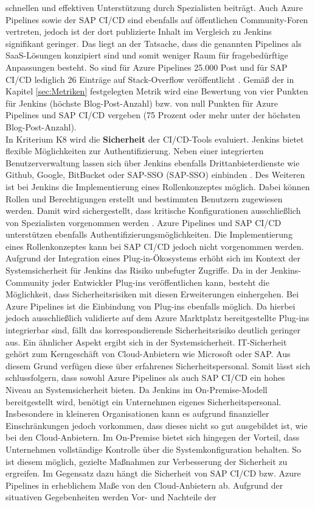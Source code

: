 schnellen und effektiven Unterstützung durch Spezialisten beiträgt. Auch Azure Pipelines sowie der SAP CI/CD sind ebenfalls auf öffentlichen Community-Foren vertreten, jedoch ist der dort publizierte Inhalt im Vergleich zu Jenkins signifikant geringer. Das liegt an der Tatsache, dass die genannten Pipelines als SaaS-Lösungen konzipiert sind und somit weniger Raum für fragebedürftige Anpassungen besteht. So sind für Azure Pipelines 25.000 Post und für SAP CI/CD lediglich 26 Einträge auf Stack-Overflow veröffentlicht \cite{StackOverflow.20230403b}\cite{StackOverflow.20230403c}. Gemäß der in Kapitel \ref{sec:Metriken} festgelegten Metrik wird eine Bewertung von vier Punkten für Jenkins (höchste Blog-Post-Anzahl) bzw. von null Punkten für Azure Pipelines und SAP CI/CD vergeben (75 Prozent oder mehr unter der höchsten Blog-Post-Anzahl).\\ In Kriterium K8 wird die \textbf{Sicherheit} der CI/CD-Tools evaluiert. Jenkins bietet flexible Möglichkeiten zur Authentifizierung. Neben einer integrierten Benutzerverwaltung lassen sich über Jenkins ebenfalls Drittanbieterdienste wie Github, Google, BitBucket oder SAP-\acl{SSO} (SAP-\acs{SSO}) einbinden \cite{.20230410f}\cite{.20230417b}\cite{.20230417c}. Des Weiteren ist bei Jenkins die Implementierung eines Rollenkonzeptes möglich. Dabei können Rollen und Berechtigungen erstellt und bestimmten Benutzern zugewiesen werden. Damit wird sichergestellt, dass kritische Konfigurationen ausschließlich von Spezialisten vorgenommen werden \cite{.20230410g}. Azure Pipelines und SAP CI/CD unterstützen ebenfalls Authentifizierungsmöglichkeiten. Die Implementierung eines Rollenkonzeptes kann bei SAP CI/CD jedoch nicht vorgenommen werden. Aufgrund der Integration eines Plug-in-Ökosystems erhöht sich im Kontext der Systemsicherheit für Jenkins das Risiko unbefugter Zugriffe. Da in der Jenkins-Community jeder Entwickler Plug-ins veröffentlichen kann, besteht die Möglichkeit, dass Sicherheitsrisiken mit diesen Erweiterungen einhergehen. Bei Azure Pipelines ist die Einbindung von Plug-ins ebenfalls möglich. Da hierbei jedoch ausschließlich validierte auf dem Azure Marktplatz bereitgestellte Plug-ins integrierbar sind, fällt das korrespondierende Sicherheitsrisiko deutlich geringer aus. Ein ähnlicher Aspekt ergibt sich in der Systemsicherheit. IT-Sicherheit gehört zum Kerngeschäft von Cloud-Anbietern wie Microsoft oder SAP. Aus diesem Grund verfügen diese über erfahrenes Sicherheitspersonal. Somit lässt sich schlussfolgern, dass sowohl Azure Pipelines als auch SAP CI/CD ein hohes Niveau an Systemsicherheit bieten. Da Jenkins im On-Premise-Modell bereitgestellt wird, benötigt ein Unternehmen eigenes Sicherheitspersonal. Insbesondere in kleineren Organisationen kann es aufgrund finanzieller Einschränkungen jedoch vorkommen, dass dieses nicht so gut ausgebildet ist, wie bei den Cloud-Anbietern. Im On-Premise bietet sich hingegen der Vorteil, dass Unternehmen vollständige Kontrolle über die Systemkonfiguration behalten. So ist diesem möglich, gezielte Maßnahmen zur Verbesserung der Sicherheit zu ergreifen. Im Gegensatz dazu hängt die Sicherheit von SAP CI/CD bzw. Azure Pipelines in erheblichem Maße von den Cloud-Anbietern ab. Aufgrund der situativen Gegebenheiten werden Vor- und Nachteile der 
